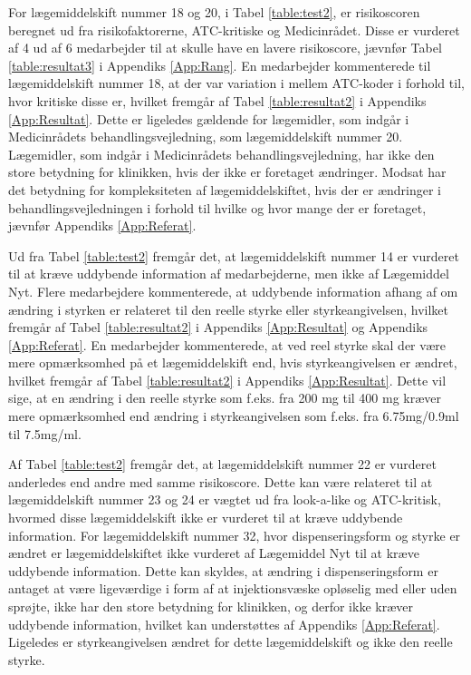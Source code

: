 For lægemiddelskift nummer 18 og 20, i Tabel \ref{table:test2}, er risikoscoren beregnet ud fra risikofaktorerne, ATC-kritiske og Medicinrådet. Disse er vurderet af 4 ud af 6 medarbejder til at skulle have en lavere risikoscore, jævnfør Tabel \ref{table:resultat3} i Appendiks \ref{App:Rang}. En medarbejder kommenterede til lægemiddelskift nummer 18, at der var variation
i mellem ATC-koder i forhold til, hvor kritiske disse er, hvilket fremgår af Tabel \ref{table:resultat2} i Appendiks \ref{App:Resultat}. Dette er ligeledes gældende for lægemidler, som indgår i Medicinrådets behandlingsvejledning, som lægemiddelskift nummer 20. Lægemidler, som indgår i Medicinrådets behandlingsvejledning, har ikke den store betydning for klinikken, hvis der ikke er foretaget ændringer. Modsat har det betydning for kompleksiteten af lægemiddelskiftet, hvis der er ændringer i behandlingsvejledningen i forhold til hvilke og hvor mange der er foretaget, jævnfør Appendiks \ref{App:Referat}.

Ud fra Tabel \ref{table:test2} fremgår det, at lægemiddelskift nummer 14 er vurderet til at kræve uddybende information af medarbejderne, men ikke af Lægemiddel Nyt. %
Flere medarbejdere kommenterede, at uddybende information afhang af om ændring i styrken er relateret til den reelle styrke eller styrkeangivelsen, hvilket fremgår af Tabel \ref{table:resultat2} i Appendiks \ref{App:Resultat} og Appendiks \ref{App:Referat}. En medarbejder kommenterede, at ved reel styrke skal der være mere opmærksomhed på et lægemiddelskift end, hvis styrkeangivelsen er ændret, hvilket fremgår af Tabel \ref{table:resultat2} i Appendiks \ref{App:Resultat}. Dette vil sige, at en ændring i den reelle styrke som f.eks. fra 200 mg til 400 mg kræver mere opmærksomhed end ændring i styrkeangivelsen som f.eks. fra 6.75mg/0.9ml til 7.5mg/ml.

Af Tabel \ref{table:test2} fremgår det, at lægemiddelskift nummer 22 er vurderet anderledes end andre med samme risikoscore. Dette kan være relateret til at lægemiddelskift nummer 23 og 24 er vægtet ud fra look-a-like og ATC-kritisk, hvormed disse lægemiddelskift ikke er vurderet til at kræve uddybende information. For lægemiddelskift nummer 32, hvor dispenseringsform og styrke er ændret er lægemiddelskiftet ikke vurderet af Lægemiddel Nyt til at kræve uddybende information. Dette kan skyldes, at ændring i dispenseringsform er antaget at være ligeværdige i form af at injektionsvæske opløselig med eller uden sprøjte, ikke har den store betydning for klinikken, og derfor ikke kræver uddybende information, hvilket kan understøttes af Appendiks \ref{App:Referat}.
Ligeledes er styrkeangivelsen ændret for dette lægemiddelskift og ikke den reelle styrke. 

